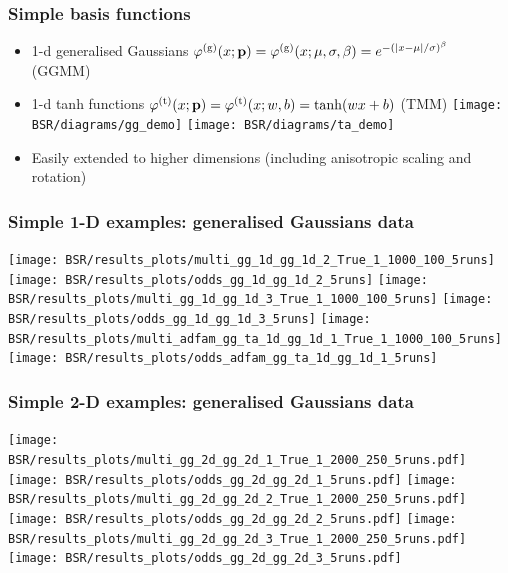 \documentclass[%
    9pt,
]{beamer}
\newcommand{\bg}[1]{\mathbf{#1}}
\newcommand{\red}[1]{\textcolor{cambblue}{#1}}
\begin{document}
\begin{frame}
    \frametitle{Simple basis functions}

    \begin{itemize}
        \item 1-d generalised Gaussians $\varphi^{\rm (g)}(x;\bg{p}) = \varphi^{\rm (g)}(x;\mu,\sigma,\beta) = e^{-(|x-\mu|/\sigma)^\beta}$ (GGMM)
        \item 1-d tanh functions  $\varphi^{\rm (t)}(x;\bg{p}) = \varphi^{\rm (t)}(x;w,b) = \tanh(wx+b)$ (TMM)
            \vfill
            \texttt{[image: BSR/diagrams/gg\_demo]}\hfill
            \texttt{[image: BSR/diagrams/ta\_demo]}
        \item Easily extended to \red{higher dimensions} (including
            \red{anisotropic scaling} and \red{rotation})
    \end{itemize}
\end{frame}

\begin{frame}
    \frametitle{Simple 1-D examples: generalised Gaussians data}

    \texttt{[image: BSR/results\_plots/multi\_gg\_1d\_gg\_1d\_2\_True\_1\_1000\_100\_5runs]}\hfill
    \texttt{[image: BSR/results\_plots/odds\_gg\_1d\_gg\_1d\_2\_5runs]}
    \texttt{[image: BSR/results\_plots/multi\_gg\_1d\_gg\_1d\_3\_True\_1\_1000\_100\_5runs]}\hfill
    \texttt{[image: BSR/results\_plots/odds\_gg\_1d\_gg\_1d\_3\_5runs]}
    \texttt{[image: BSR/results\_plots/multi\_adfam\_gg\_ta\_1d\_gg\_1d\_1\_True\_1\_1000\_100\_5runs]}\hfill
    \texttt{[image: BSR/results\_plots/odds\_adfam\_gg\_ta\_1d\_gg\_1d\_1\_5runs]}
\end{frame}

\begin{frame}
    \frametitle{Simple 2-D examples: generalised Gaussians data}

\texttt{[image: BSR/results\_plots/multi\_gg\_2d\_gg\_2d\_1\_True\_1\_2000\_250\_5runs.pdf]}\hfill
\texttt{[image: BSR/results\_plots/odds\_gg\_2d\_gg\_2d\_1\_5runs.pdf]}
\texttt{[image: BSR/results\_plots/multi\_gg\_2d\_gg\_2d\_2\_True\_1\_2000\_250\_5runs.pdf]}\hfill
\texttt{[image: BSR/results\_plots/odds\_gg\_2d\_gg\_2d\_2\_5runs.pdf]}
\texttt{[image: BSR/results\_plots/multi\_gg\_2d\_gg\_2d\_3\_True\_1\_2000\_250\_5runs.pdf]}\hfill
\texttt{[image: BSR/results\_plots/odds\_gg\_2d\_gg\_2d\_3\_5runs.pdf]}
\end{frame}
\end{document}
